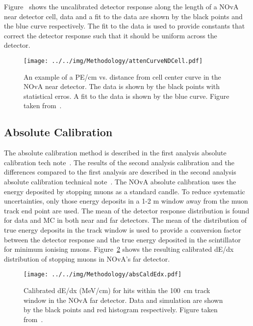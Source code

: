 Figure~\label{fig:attenCurvND} shows the uncalibrated
detector response along the length of a NOvA near detector cell, data
and a fit to the data are shown by the black points and the blue curve
respectively. The fit to the data is used to provide constants that
correct the detector response such that it should be uniform across
the detector.~\cite{alexAtten}~\cite{prabAtten}

\begin{figure}
  \centering
\texttt{[image: ../../img/Methodology/attenCurveNDCell.pdf]}
  \caption{
    An example of a PE/cm vs. distance from cell center curve in the
    NOvA near detector. The data is shown by the black points with
    statistical erros. A fit to the data is shown by the blue
    curve. Figure taken from~\cite{alexAtten}.
  }
  \label{fig:attenCurvND}
\end{figure}


\subsection{Absolute Calibration}
The absolute calibration method is described in the first analysis
absolute calibration tech note~\cite{lukeAbsCal}. The results of the
second analysis calibration and the differences compared to the first
analysis are described in the second analysis absolute calibration
technical note~\cite{dianaAbsCal}.
The NOvA absolute calibration uses the energy deposited by stopping
muons as a standard candle. 
To reduce systematic uncertainties, only those
energy deposits in a 1-2 m window away from the muon track end point
are used. 
The mean of the detector response distribution is found for
data and MC in both near and far detectors. 
The mean of the distribution of true energy deposits in the track
window is used to provide a conversion factor between the detector
response and the true energy deposited in the scintillator for minimum
ionising muons.
Figure~\ref{fig:calibrateddEdx} shows the resulting calibrated dE/dx
distribution of stopping muons in NOvA's far
detector.~\cite{lukeAbsCal} 

\begin{figure}
  \centering
  \texttt{[image: ../../img/Methodology/absCaldEdx.pdf]}
  \caption{
    Calibrated dE/dx (MeV/cm) for hits within the 100~cm track window
    in the NOvA far detector. 
    Data and simulation are shown by the black points and red
    histogram respectively.
    Figure taken from~\cite{lukeAbsCal}.
  } 
  \label{fig:calibrateddEdx}
\end{figure}


